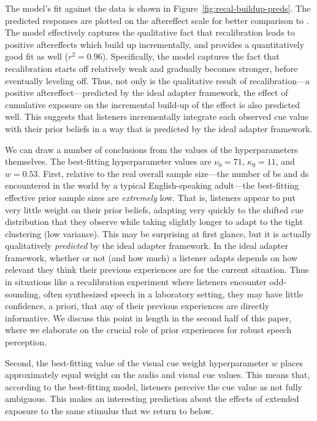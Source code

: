 The model's fit against the data is shown in Figure~\ref{fig:recal-buildup-preds}. The predicted responses are plotted on the aftereffect scale for better comparison to \textcite{Vroomen2007}. The model effectively captures the qualitative fact that recalibration leads to positive aftereffects which  build up incrementally, and provides a quantitatively good fit as well ($r^2=0.96$).  Specifically, the model captures the fact that recalibration starts off relatively weak and gradually becomes stronger, before eventually leveling off.  Thus, not only is the qualitative result of recalibration---a positive aftereffect---predicted by the ideal adapter framework, the effect of cumulative exposure on the incremental build-up of the effect is also predicted well.  This suggests that listeners incrementally integrate each observed cue value with their prior beliefs in a way that is predicted by the ideal adapter framework.

We can draw a number of conclusions from the values of the hyperparameters themselves.
The best-fitting hyperparameter values are $\nu_0=71$, $\kappa_0=11$, and $w=0.53$.
First,
relative to the real overall sample size---the number of \ph bs and \ph ds encountered in the world by a typical English-speaking adult---the best-fitting effective prior sample sizes are \emph{extremely} low.
That is, listeners appear to put very little weight on their prior beliefs, adapting very quickly to the shifted cue distribution that they observe while taking slightly longer to adapt to the tight clustering (low variance).
This may be surprising at first glance, but it is actually qualitatively \emph{predicted} by the ideal adapter framework.
In the ideal adapter framework, whether or not (and how much) a listener adapts depends on how relevant they think their previous experiences are for the current situation. Thus in situations like a recalibration experiment where listeners encounter odd-sounding, often synthesized speech in a laboratory setting, they may have little confidence, a priori, that any of their previous experiences are directly informative. We discuss this point in length in the second half of this paper, where we elaborate on the crucial role of prior experiences for robust speech perception.

Second, the best-fitting value of the visual cue weight hyperparameter $w$ places approximately equal weight on the audio and visual cue values.  This means that, according to the best-fitting model, listeners perceive the cue value as not fully ambiguous. This makes an interesting prediction about the effects of extended exposure to the same stimulus that we return to below. %

